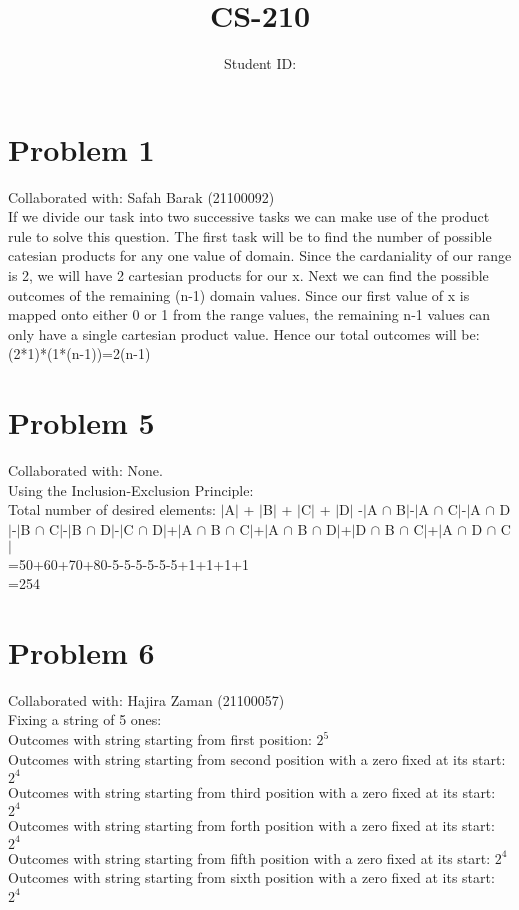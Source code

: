 \documentclass{article}
\title{CS-210 \hwNo}
\author{\myname \qquad Student ID: \myid}
\begin{document}
\maketitle

\section{Problem 1}
Collaborated with: Safah Barak (21100092) \\
If we divide our task into two successive tasks we can make use of the product rule to solve this question. The first task will be to find the number of possible catesian products for any one value of domain. Since the cardaniality of our range is 2, we will have 2 cartesian products for our x. Next we can find the possible outcomes of the remaining (n-1) domain values. Since our first value of x is mapped onto either 0 or 1 from the range values, the remaining n-1 values can only have a single cartesian product value. Hence our total outcomes will be:\\
(2*1)*(1*(n-1))=2(n-1)

\section{Problem 5}
Collaborated with: None.\\
Using the Inclusion-Exclusion Principle:\\
Total number of desired elements: $\mid$A$\mid$ + $\mid$B$\mid$ + $\mid$C$\mid$ + $\mid$D$\mid$ -$\mid$A $\cap$ B$\mid$-$\mid$A $\cap$ C$\mid$-$\mid$A $\cap$ D$\mid$-$\mid$B $\cap$ C$\mid$-$\mid$B $\cap$ D$\mid$-$\mid$C $\cap$ D$\mid$+$\mid$A $\cap$ B $\cap$ C$\mid$+$\mid$A $\cap$ B $\cap$ D$\mid$+$\mid$D $\cap$ B $\cap$ C$\mid$+$\mid$A $\cap$ D $\cap$ C$\mid$\\
=50+60+70+80-5-5-5-5-5-5+1+1+1+1\\
=254\\


\section{Problem 6}
Collaborated with: Hajira Zaman (21100057)\\
Fixing a string of 5 ones:\\
Outcomes with string starting from first position: $2^{5}$\\
Outcomes with string starting from second position with a zero fixed at its start: $2^{4}$\\ 
Outcomes with string starting from third position with a zero fixed at its start: $2^{4}$ \\
Outcomes with string starting from forth position with a zero fixed at its start: $2^{4}$ \\
Outcomes with string starting from fifth position with a zero fixed at its start: $2^{4}$ \\
Outcomes with string starting from sixth position with a zero fixed at its start: $2^{4}$ \\
\end{document}
